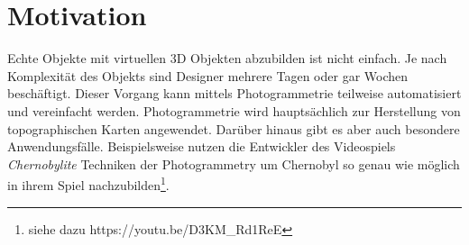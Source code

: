 
\chapter{Motivation}\label{sec:motivation}
Echte Objekte mit virtuellen 3D Objekten abzubilden ist nicht einfach. Je nach Komplexität des Objekts sind Designer mehrere Tagen oder gar Wochen beschäftigt.
Dieser Vorgang kann mittels Photogrammetrie teilweise automatisiert und vereinfacht werden.
Photogrammetrie wird hauptsächlich zur Herstellung von topographischen Karten angewendet\cite{kraus_2004}.
Darüber hinaus gibt es aber auch besondere Anwendungsfälle.
Beispielsweise nutzen die Entwickler des Videospiels \emph{Chernobylite} Techniken der Photogrammetry um Chernobyl so genau wie möglich in ihrem Spiel nachzubilden\footnote{siehe dazu https://youtu.be/D3KM\_Rd1ReE}.